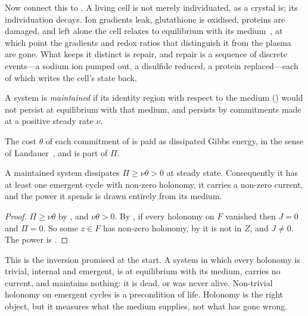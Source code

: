 Now connect this to . A living cell is not merely
individuated, as a crystal is; its individuation decays. Ion gradients leak,
glutathione is oxidised, proteins are damaged, and left alone the cell
relaxes to equilibrium with its medium~\citep{schrodinger1944,kondepudi1998},
at which point the gradients and redox ratios that distinguish it from the
plasma are gone. \lnkS{} What keeps it distinct is repair, and repair is a
sequence of discrete events---a sodium ion pumped out, a disulfide reduced,
a protein replaced---each of which writes the cell's state back.

\begin{definition}
\label{c1:def-maintained}
A system is \emph{maintained} if its identity region with respect to the
medium () would not persist at equilibrium with that
medium, and persists by commitments made at a positive steady rate $\nu$.
\end{definition}

\begin{inputstmt}
\label{c1:in-landauer}
\lnkS{} The cost $\theta$ of each commitment of  is
paid as dissipated Gibbs energy, in the sense of
Landauer~\citep{Landauer1961,bennett1982}, and is part of $\Pi$.
\end{inputstmt}

\begin{theorem}
\label{c1:thm-maintenance}
\lnkD{} A maintained system dissipates $\Pi\ge\nu\theta>0$ at steady state.
Consequently it has at least one emergent cycle with non-zero holonomy, it
carries a non-zero current, and the power it spends is drawn entirely from
its medium.
\end{theorem}

\begin{proof}
$\Pi\ge\nu\theta$ by , and $\nu\theta>0$. By
, if every holonomy on $F$ vanished then $J=0$ and
$\Pi=0$. So some $z\in F$ has non-zero holonomy, by 
it is not in $Z$, and $J\neq0$. The power is .
\end{proof}

This is the inversion promised at the start. A system in which every
holonomy is trivial, internal and emergent, is at equilibrium with its
medium, carries no current, and maintains nothing: it is dead, or was never
alive. Non-trivial holonomy on emergent cycles is a precondition of life.
Holonomy is the right object, but it measures what the medium supplies, not
what has gone wrong.

